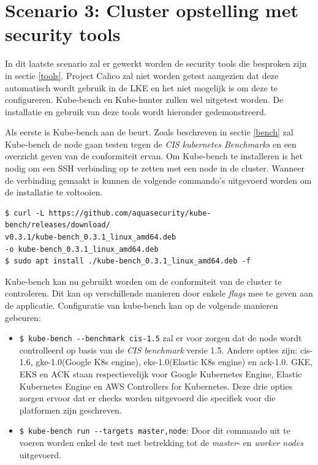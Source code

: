 \clearpage
\section{Scenario 3: Cluster opstelling met security tools}
In dit laatste scenario zal er gewerkt worden de security tools die besproken zijn in sectie \ref{tools}. Project Calico zal niet worden getest aangezien dat deze automatisch wordt gebruik in de LKE en het niet mogelijk is om deze te configureren. Kube-bench en Kube-hunter zullen wel uitgetest worden. De installatie en gebruik van deze tools wordt hieronder gedemonstreerd.

Als eerste is Kube-bench aan de beurt. Zoals beschreven in sectie \ref{bench} zal Kube-bench de node gaan testen tegen de \textit{CIS kubernetes Benchmarks} en een overzicht geven van de conformiteit ervan. Om Kube-bench te installeren is het nodig om een SSH verbinding op te zetten met een node in de cluster. Wanneer de verbinding gemaakt is kunnen de volgende commando's uitgevoerd worden om de installatie te voltooien.

\begin{verbatim} 
$ curl -L https://github.com/aquasecurity/kube-bench/releases/download/
v0.3.1/kube-bench_0.3.1_linux_amd64.deb
-o kube-bench_0.3.1_linux_amd64.deb
$ sudo apt install ./kube-bench_0.3.1_linux_amd64.deb -f
\end{verbatim}

Kube-bench kan nu gebruikt worden om de conformiteit van de cluster te controleren. Dit kan op verschillende manieren door enkele \textit{flags} mee te geven aan de applicatie. Configuratie van kube-bench kan op de volgende manieren gebeuren:
\begin{itemize}
	\item \verb|$ kube-bench --benchmark cis-1.5| zal er voor zorgen dat de node wordt controlleerd op basis van de \textit{CIS benchmark} versie 1.5. Andere opties zijn: cis-1.6, gke-1.0(Google K8s engine), eks-1.0(Elastic K8s engine) en ack-1.0. GKE, EKS en ACK staan respectievelijk voor Google Kubernetes Engine, Elastic Kubernetes Engine en AWS Controllers for Kubernetes. Deze drie opties zorgen ervoor dat er checks worden uitgevoerd die specifiek voor die platformen zijn geschreven.
	\item \verb|$ kube-bench run --targets master,node|: Door dit commando uit te voeren worden enkel de test met betrekking tot de \textit{master}- en \textit{worker nodes} uitgevoerd.
\end{itemize}

